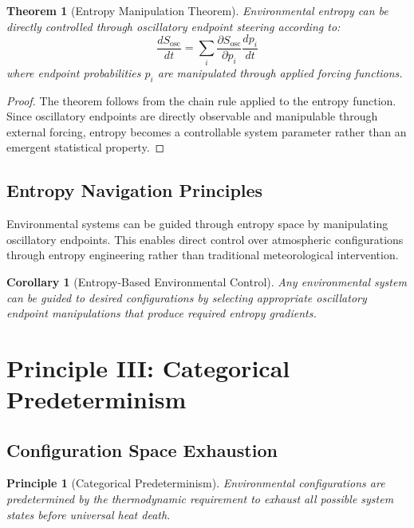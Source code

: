 \documentclass[12pt,a4paper]{article}
\newtheorem{theorem}{Theorem}
\newtheorem{corollary}{Corollary}
\newtheorem{principle}{Principle}
\begin{document}
\begin{theorem}[Entropy Manipulation Theorem]
Environmental entropy can be directly controlled through oscillatory endpoint steering according to:
\begin{equation}
\frac{dS_{\text{osc}}}{dt} = \sum_i \frac{\partial S_{\text{osc}}}{\partial p_i} \frac{dp_i}{dt}
\end{equation}
where endpoint probabilities $p_i$ are manipulated through applied forcing functions.
\end{theorem}

\begin{proof}
The theorem follows from the chain rule applied to the entropy function. Since oscillatory endpoints are directly observable and manipulable through external forcing, entropy becomes a controllable system parameter rather than an emergent statistical property.
\end{proof}

\subsection{Entropy Navigation Principles}

Environmental systems can be guided through entropy space by manipulating oscillatory endpoints. This enables direct control over atmospheric configurations through entropy engineering rather than traditional meteorological intervention.

\begin{corollary}[Entropy-Based Environmental Control]
Any environmental system can be guided to desired configurations by selecting appropriate oscillatory endpoint manipulations that produce required entropy gradients.
\end{corollary}

\section{Principle III: Categorical Predeterminism}

\subsection{Configuration Space Exhaustion}

\begin{principle}[Categorical Predeterminism]
Environmental configurations are predetermined by the thermodynamic requirement to exhaust all possible system states before universal heat death.
\end{principle}
\end{document}
